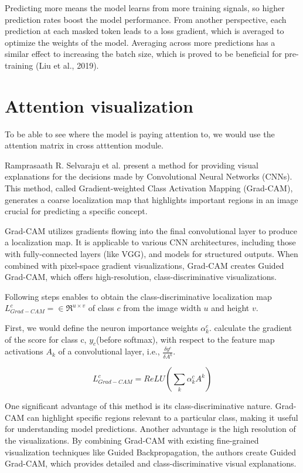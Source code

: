 Predicting more means the model learns from more training signals, so higher prediction rates boost the model performance. From another perspective, each prediction at each masked token leads to a loss gradient, which is averaged to optimize the weights of the model. Averaging across more predictions has a similar effect to increasing the batch size, which is proved to be beneficial for pre-training (Liu et al., 2019). 

\section{Attention visualization}
To be able to see where the model is paying attention to, we would use the attention matrix in cross atttention module. 

Ramprasaath R. Selvaraju et al. present a method for providing visual explanations for the decisions made by Convolutional Neural Networks (CNNs). This method, called Gradient-weighted Class Activation Mapping (Grad-CAM), generates a coarse localization map that highlights important regions in an image crucial for predicting a specific concept.

Grad-CAM utilizes gradients flowing into the final convolutional layer to produce a localization map. It is applicable to various CNN architectures, including those with fully-connected layers (like VGG), and models for structured outputs. When combined with pixel-space gradient visualizations, Grad-CAM creates Guided Grad-CAM, which offers high-resolution, class-discriminative visualizations.

Following steps enables to obtain the class-discriminative localization map $L^c_{Grad-CAM} = \in\Re^{u \times v}$ of class $c$ from the image width $u$ and height $v$. 

First, we would define the neuron importance weights $\alpha^c_k$. calculate the gradient of the score for class c, $y_c$(before softmax), with respect to the feature map activations $A_k$ of a convolutional layer, i.e., $\frac{\delta y^c}{\delta A^k}$. 
 
\begin{displaymath}
    L^c_{Grad-CAM} = ReLU(\sum_k\alpha^c_kA^k)
\end{displaymath}

One significant advantage of this method is its class-discriminative nature. Grad-CAM can highlight specific regions relevant to a particular class, making it useful for understanding model predictions. Another advantage is the high resolution of the visualizations. By combining Grad-CAM with existing fine-grained visualization techniques like Guided Backpropagation, the authors create Guided Grad-CAM, which provides detailed and class-discriminative visual explanations.

